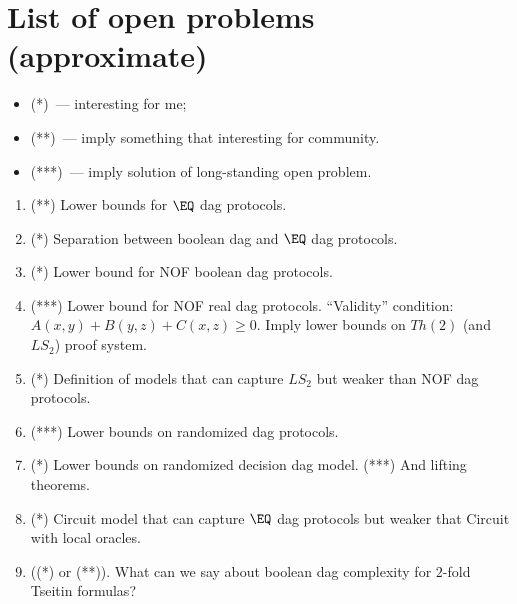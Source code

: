 \section{List of open problems (approximate)}

\begin{itemize}
    \item (*)~--- interesting for me;
    \item (**)~--- imply something that interesting for community.
    \item (***)~--- imply solution of long-standing open problem.
\end{itemize}


\begin{enumerate}
    \item (**) Lower bounds for $\EQ$ dag protocols.
    \item (*) Separation between boolean dag and $\EQ$ dag protocols.
    \item (*) Lower bound for NOF boolean dag protocols.
    \item (***) Lower bound for NOF real dag protocols. ``Validity'' condition: $A(x, y) + B(y, z) +
        C(x, z) \ge 0$. Imply lower bounds on $Th(2)$ (and $LS_2$) proof system.
    \item (*) Definition of models that can capture $LS_2$ but weaker than NOF dag protocols.
    \item (***) Lower bounds on randomized dag protocols.
    \item (*) Lower bounds on randomized decision dag model. (***) And lifting theorems. 
    \item (*) Circuit model that can capture $\EQ$ dag protocols but weaker that Circuit with local
        oracles.
    \item ((*) or (**)). What can we say about boolean dag complexity for $2$-fold Tseitin formulas?
\end{enumerate}